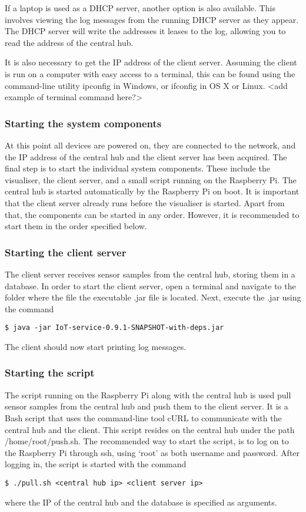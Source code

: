 \documentclass[../document.tex]{subfiles}
\begin{document}
If a laptop is used as a DHCP server, another option is also available. This involves viewing the log messages from the running DHCP server as they appear. The DHCP server will write the addresses it leases to the log, allowing you to read the address of the central hub.

It is also necessary to get the IP address of the client server. Assuming the client is run on a computer with easy access to a terminal, this can be found using the command-line utility ipconfig in Windows, or ifconfig in OS X or Linux.
{\color{red} <add example of terminal command here?>}


\subsubsection{Starting the system components}
At this point all devices are powered on, they are connected to the network, and the IP address of the central hub and the client server has been acquired. The final step is to start the individual system components. These include the visualiser, the client server, and a small script running on the Raspberry Pi. The central hub is started automatically by the Raspberry Pi on boot. It is important that the client server already runs before the visualiser is started. Apart from that, the components can be started in any order. However, it is recommended to start them in the order specified below.

\subsubsection{Starting the client server}
The client server receives sensor samples from the central hub, storing them in a database. In order to start the client server, open a terminal and navigate to the folder where the file the executable .jar file is located. Next, execute the .jar using the command
\begin{lstlisting}
$ java -jar IoT-service-0.9.1-SNAPSHOT-with-deps.jar
\end{lstlisting} The client should now start printing log messages.

\subsubsection{Starting the script}
The script running on the Raspberry Pi along with the central hub is used pull sensor samples from the central hub and push them to the client server. It is a Bash script that uses the command-line tool cURL to communicate with the central hub and the client. This script resides on the central hub under the path /home/root/push.sh. The recommended way to start the script, is to log on to the Raspberry Pi through ssh, using ‘root’ as both username and password. After logging in, the script is started with the command
\begin{lstlisting}
$ ./pull.sh <central hub ip> <client server ip>
\end{lstlisting}
where the IP of the central hub and the database is specified as arguments.
\end{document}
